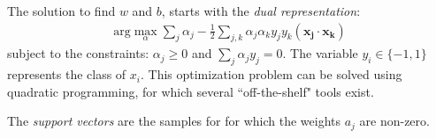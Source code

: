 The solution to find $w$ and $b$, starts with the \emph{dual representation}:
\begin{align}
\label{eq:dual}
\text{arg}\max_\alpha\sum_j\alpha_j - \frac{1}{2}\sum_{j,k}\alpha_j\alpha_ky_jy_k(\mathbf{x_j} \cdot \mathbf{x_k})
\end{align} subject to the constraints: $\alpha_j \geq 0$ and $\sum_j\alpha_jy_j=0$. The variable $y_i \in \{-1, 1\}$ represents the class of $x_i$. This optimization problem can be solved using quadratic programming, for which several ``off-the-shelf" tools exist.

The \emph{support vectors} are the samples for for which the weights $a_j$ are non-zero. 